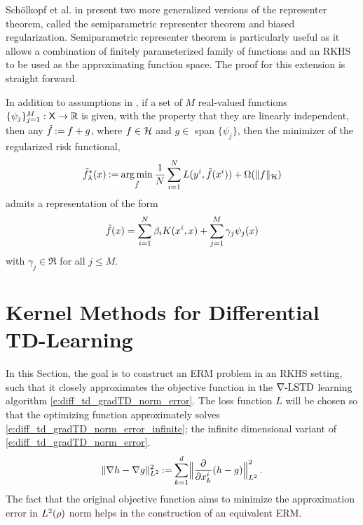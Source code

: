 Sch\"{o}lkopf et al. in \cite{schhersmo01} present two more generalized versions of the representer theorem, called the semiparametric representer theorem and biased regularization. Semiparametric representer theorem is particularly useful as it allows a combination of finitely parameterized family of functions and an RKHS to be used as the approximating function space. The proof for this extension is straight forward.  

\begin{theorem}
In addition to assumptions in , if a set of $M$ real-valued functions $\{\psi_j\}_{j=1}^M : {\sf X} \to \mathbb{R}$ is given, with the property that they are linearly independent, then any $\tilde f \mathbin{:=} f + g$, where $f \in {\cal H}$ and $g \in$ span $\{\psi_j\}$, then the minimizer of the regularized risk functional,
\begin{equation*}
\tilde f^*_\lambda(x) \mathbin{:=} \mathop{\rm arg{\,}min}_{\tilde f} \frac{1}{N} \sum_{i=1}^N L(y^i,\tilde f(x^i)) + \Omega(\|f\|_{\cal H})
\end{equation*}
admits a representation of the form
\begin{equation*}
\tilde f(x) = \sum_{i=1}^N \beta_i K(x^i, x) + \sum_{j=1}^M \gamma_j \psi_j(x)
\end{equation*}
with $\gamma_j \in \Re$ for all $j \leq M$. 
\end{theorem}
\section{Kernel Methods for Differential TD-Learning}
\label{s:kernel_choices}

In this Section, the goal is to construct an ERM problem in an RKHS setting, such that it closely approximates the objective function in the $\nabla\text{-LSTD}$ learning algorithm \eqref{e:diff_td_gradTD_norm_error}. The loss function $L$ will be chosen so that the optimizing function approximately solves \eqref{e:diff_td_gradTD_norm_error_infinite}; the infinite dimensional variant of \eqref{e:diff_td_gradTD_norm_error}. 
\begin{equation}
\| \nabla h -  \nabla g \|^2_{L^2}   \eqdef \sum_{k=1}^d    \Bigl\|  \frac{\partial}{\partial x^i_k} (h-g)  \Bigr\|^2_{L^2}
\, .
\label{e:diff_td_gradTD_norm_error_infinite}
\end{equation}
The fact that the original objective function aims to minimize the approximation error in $L^2(\rho)$ norm helps in the construction of an equivalent ERM.

